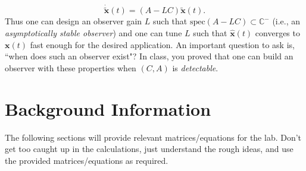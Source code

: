 \begin{equation}\label{lab3_equ:luenberger_error}
    \mathbf{\dot{\tilde{x}}}(t) = (A-LC) \tilde{\mathbf{x}}(t).
\end{equation}
Thus one can design an observer gain $L$ such that $\text{spec}(A-LC) \subset \mathbb{C}^-$ (i.e., an \emph{asymptotically stable observer}) and one can tune $L$ such that $\hat{\mathbf{x}}(t)$ converges to $\mathbf{x}(t)$ fast enough for the desired application. An important question to ask is, ``when does such an observer exist"? In class, you proved that one can build an observer with these properties when $(C,A)$ is \emph{detectable}.


\section{Background Information}\label{section:lab3_prelab}
The following sections will provide relevant matrices/equations for the lab. Don't get too caught up in the calculations, just understand the rough ideas, and use the provided matrices/equations as required.

